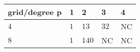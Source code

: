 \begin{tabular}{lllll}
\hline
 grid/degree p   & 1   & 2     & 3    & 4   \\
\hline
 $4$             & $1$ & $13$  & $32$ & NC  \\
 $8$             & $1$ & $140$ & NC   & NC  \\
\hline
\end{tabular}